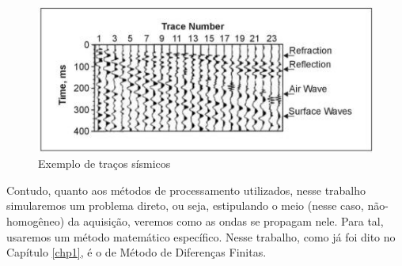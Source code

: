     \begin{figure}[H]
        \centering
        \includegraphics[scale=3.]{chapters/chp2/images/seismic-traces.jpg}
        \caption{Exemplo de traços sísmicos}
        \label{fig:seismic-traces}
    \end{figure}

	Contudo, quanto aos métodos de processamento utilizados, nesse 
	trabalho simularemos um problema
	direto, ou seja, estipulando o meio (nesse caso, não-homogêneo) da aquisição,
	veremos como as ondas se propagam nele. Para tal, usaremos um método
	matemático específico. Nesse trabalho, como já foi dito no Capítulo
	\ref{chp1}, é o de Método de Diferenças Finitas.